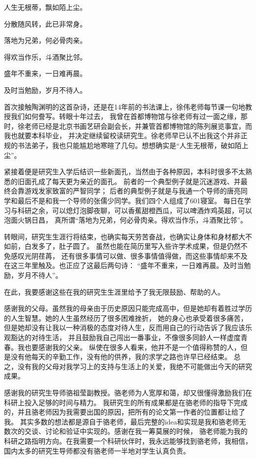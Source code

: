 
\begin{ack}
人生无根蒂，飘如陌上尘。

分散随风转，此已非常身。

落地为兄弟，何必骨肉亲。

得欢当作乐，斗酒聚比邻。

盛年不重来，一日难再晨。

及时当勉励，岁月不待人。


首次接触陶渊明的这首杂诗，还是在14年前的书法课上，徐伟老师每节课一句地教授我们如何誊写。转眼十年过去， 我曾在首都博物馆与徐老师有过一面之缘，那时，徐老师已经是北京书画艺研会副会长，并兼管首都博物馆的陈列展览事宜，而我也就要本科毕业， 并决定继续留校读研究生。徐老师早已认不出我这个并非正规的书法弟子，我也只能尴尬地寒暄了几句。想想确实是“人生无根蒂，破如陌上尘”。

紧接着便是研究生入学后结识一些新面孔，当然由于各种原因，本科时很多不太熟悉的旧面孔成了每天更为亲近的面孔。 前者的一个典型例子就是沉迷游戏、并最终会靠游戏发家致富的严智同学； 后者的典型例子就是与我通一个导师的唐亮同学和最后不是和我一个导师的张儒少同学。我们四个人组成了601寝室。 每日在学习与科研之余，可以熄灯泡脚夜聊，可以香蕉甜橙西瓜，可以啤酒炸鸡英超，可以泡面火锅日昌， 真所谓“落地为兄弟，何必骨肉亲。得欢当作乐，斗酒聚比邻”。

转眼间，研究生生涯行将结束，也确实每天劳苦奋战，也确实让身体和身材都大不如前，白发多了，肚子圆了。 虽然也能在简历里写入些许学术成果，但是仍然不免感叹光阴荏苒， 还有很多事情可以做、很多事情值得做，而这些事情却来不及在这三年里触及。也正应了这最后两句诗： “盛年不重来，一日难再晨。及时当勉励，岁月不待人”。

在此，我要感谢这些在我的研究生生涯里给予了我无限鼓励、帮助的人。

感谢我的父母。虽然我的母亲由于历史原因只能完成高中，但是她却有着胜过学历的人生智慧。她的人生虽然经历了很多困难挫折， 她的身心也承受着很多痛苦，但是她却没有让我以一种消极的态度对待人生，反而用自己的行动告诉了我应该乐观豁达的对待生活， 并且鼓励我自己闯出一番事业，不像很多同龄人一样虚度青春。我也要感谢我的父亲。 纵使在很多人看来，他并不是一个值得称赞的人，但是没有他每天的辛勤工作，没有他的供养，我的求学之路也许早已经结束。 总之，没有我的父母对我学习上的支持与生活上的关爱，我绝不可能做出今天的研究成果。

感谢我的研究生导师骆祖莹副教授。骆老师为人宽厚和蔼，却又很懂得激励我们在科研上投入足够的时间与精力。 我研究生的所有成果都是在骆老师的指导下完成的，并且骆老师因为我需要出国的原因，把所有的论文第一作者的位置都让给了我。 其实多数的想法都是源自于骆老师，最后完整的idea和实现是我和骆老师无数次的交谈、讨论和验证中实现的。感谢在我一筹莫展的时候， 骆老师能为我的科研之路指明方向。在我需要一个科研伙伴时，我永远能够找到骆老师，我相信， 国内太多的研究生导师都没有骆老师一半地对学生认真负责。


\end{ack}
